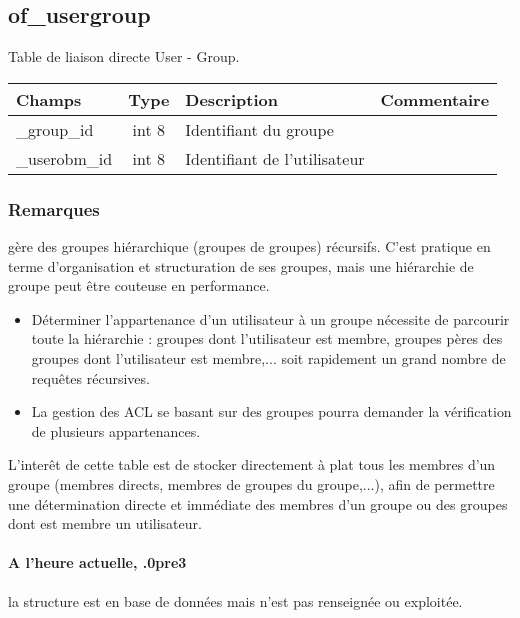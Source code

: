 \subsection{of\_usergroup}
Table de liaison directe User - Group.\\

\begin{tabular}{|p{3cm}|c|p{5.4cm}|p{2.6cm}|}
\hline
\textbf{Champs} & \textbf{Type} & \textbf{Description} & \textbf{Commentaire} \\
\hline
\_group\_id & int 8 & Identifiant du groupe & \\
\hline
\_userobm\_id & int 8 & Identifiant de l'utilisateur & \\
\hline
\end{tabular}


\subsubsection{Remarques}

\obm gère des groupes hiérarchique (groupes de groupes) récursifs. C'est pratique en terme d'organisation et structuration de ses groupes, mais une hiérarchie de groupe peut être couteuse en performance.
\begin{itemize}
\item Déterminer l'appartenance d'un utilisateur à un groupe nécessite de parcourir toute la hiérarchie : groupes dont l'utilisateur est membre, groupes pères des groupes dont l'utilisateur est membre,... soit rapidement un grand nombre de requêtes récursives.
\item La gestion des ACL se basant sur des groupes pourra demander la vérification de plusieurs appartenances.
\end{itemize}

L'interêt de cette table est de stocker directement à plat tous les membres d'un groupe (membres directs, membres de groupes du groupe,...), afin de permettre une détermination directe et immédiate des membres d'un groupe ou des groupes dont est membre un utilisateur.

\paragraph{A l'heure actuelle, .0pre3} la structure est en base de données mais n'est pas renseignée ou exploitée.
